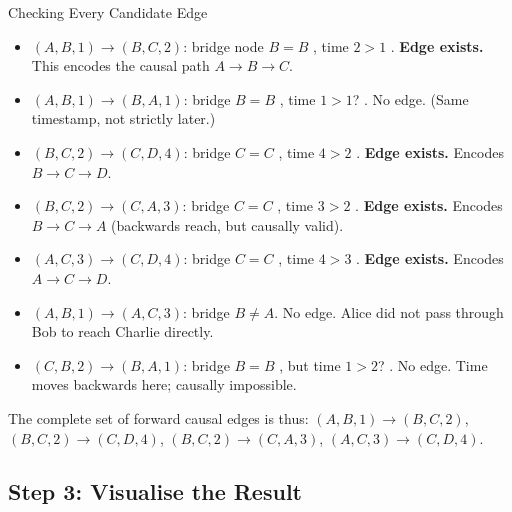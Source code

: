 \begin{examplebox}{Checking Every Candidate Edge}
\begin{itemize}[noitemsep]
    \item $(A,B,1) \to (B,C,2)$: bridge node $B=B$ \checkmark, time $2>1$ \checkmark.
          \textbf{Edge exists.} This encodes the causal path $A \to B \to C$.
    \item $(A,B,1) \to (B,A,1)$: bridge $B=B$ \checkmark, time $1>1$? \texttimes. No edge.
          (Same timestamp, not strictly later.)
    \item $(B,C,2) \to (C,D,4)$: bridge $C=C$ \checkmark, time $4>2$ \checkmark.
          \textbf{Edge exists.} Encodes $B \to C \to D$.
    \item $(B,C,2) \to (C,A,3)$: bridge $C=C$ \checkmark, time $3>2$ \checkmark.
          \textbf{Edge exists.} Encodes $B \to C \to A$ (backwards reach, but causally valid).
    \item $(A,C,3) \to (C,D,4)$: bridge $C=C$ \checkmark, time $4>3$ \checkmark.
          \textbf{Edge exists.} Encodes $A \to C \to D$.
    \item $(A,B,1) \to (A,C,3)$: bridge $B \neq A$. No edge. Alice did not pass through Bob
          to reach Charlie directly.
    \item $(C,B,2) \to (B,A,1)$: bridge $B=B$ \checkmark, but time $1 > 2$? \texttimes.
          No edge. Time moves backwards here; causally impossible.
\end{itemize}
The complete set of forward causal edges is thus:
$(A,B,1) \to (B,C,2)$, $(B,C,2) \to (C,D,4)$, $(B,C,2) \to (C,A,3)$, $(A,C,3) \to (C,D,4)$.
\end{examplebox}

\subsection{Step 3: Visualise the Result}

